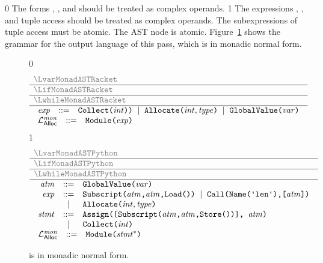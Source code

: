 \documentclass[7x10]{TimesAPriori_MIT}%
\newcommand{\gray}[1]{{\color{gray} #1}}
\def\racketEd{0}
\def\pythonEd{1}
\def\edition{1}
\newcommand{\pythonColor}[0]{}
\numberwithin{theorem}{chapter}
\numberwithin{definition}{chapter}
\numberwithin{equation}{chapter}
\begin{document}
{\if\edition\racketEd
%
The forms , , and 
should be treated as complex operands.
%
\fi}
%
{\if\edition\pythonEd\pythonColor
%
The expressions , ,
and tuple access should be treated as complex operands.  The
subexpressions of tuple access must be atomic.
The  AST node is atomic.
%
\fi}
Figure~\ref{fig:Lvec-anf-syntax}
shows the grammar for the output language \LangAllocANF{} of this
pass, which is \LangAlloc{} in monadic normal form.

\newcommand{\LtupMonadASTRacket}{
\begin{array}{rcl}
\Exp &::=& \COLLECT{\Int} \RP \MID \ALLOCATE{\Int}{\Type}
   \MID \GLOBALVALUE{\Var}
\end{array}

}

\newcommand{\LtupMonadASTPython}{
\begin{array}{rcl}
\Atm &::=& \GLOBALVALUE{\Var} \\
\Exp &::=& \GET{\Atm}{\Atm} 
     \MID \LEN{\Atm}\\
   &\MID& \ALLOCATE{\Int}{\Type}\\
\Stmt{} &::=& \ASSIGN{\PUT{\Atm}{\Atm}}{\Atm} \\
   &\MID& \COLLECT{\Int}
\end{array}
}

\begin{figure}[tp]
\centering
\begin{tcolorbox}[colback=white]
\small
{\if\edition\racketEd    
\[
\begin{array}{l}
  \gray{\LvarMonadASTRacket} \\ \hline
  \gray{\LifMonadASTRacket} \\ \hline
  \gray{\LwhileMonadASTRacket} \\ \hline
    \LtupMonadASTRacket \\
\begin{array}{rcl}
\LangAllocANFM{}  &::=& \PROGRAM{\code{'()}}{\Exp} 
\end{array}
\end{array}
\]
\fi}
{\if\edition\pythonEd\pythonColor
\[
\begin{array}{l}
  \gray{\LvarMonadASTPython} \\ \hline
  \gray{\LifMonadASTPython} \\ \hline
  \gray{\LwhileMonadASTPython} \\ \hline
  \LtupMonadASTPython   \\
  \begin{array}{rcl}
     \LangAllocANFM{} &::=& \PROGRAM{\code{'()}}{\Stmt^{*}}
  \end{array}
\end{array}
\]
\fi}
\end{tcolorbox}

\caption{\LangAllocANF{} is \LangAlloc{} in monadic normal form.}
\label{fig:Lvec-anf-syntax}
\end{figure}
\end{document}
